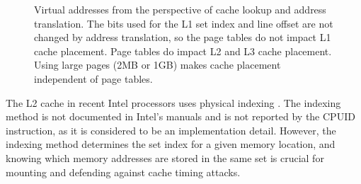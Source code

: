 \begin{figure}[hbtp]
  \caption{
    Virtual addresses from the perspective of cache lookup and address
    translation. The bits used for the L1 set index and line offset are not
    changed by address translation, so the page tables do not impact L1 cache
    placement. Page tables do impact L2 and L3 cache placement. Using large
    pages (2MB or 1GB) makes cache placement independent of page tables.
  }
  \label{fig:caching_and_paging}
\end{figure}

The L2 cache in recent Intel processors uses physical indexing
\cite{patterson2013architecture}. The indexing method is not documented in
Intel's manuals and is not reported by the CPUID instruction, as it is
considered to be an implementation detail. However, the indexing method
determines the set index for a given memory location, and knowing which memory
addresses are stored in the same set is crucial for mounting and defending
against cache timing attacks.
